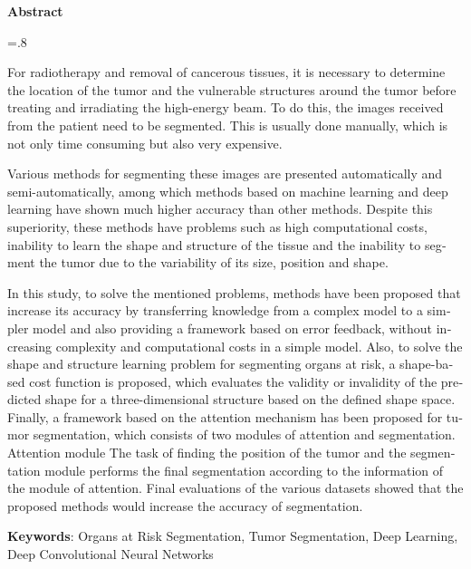 


\pagestyle{empty}

\begin{latin}

\begin{center}
\textbf{Abstract}
\end{center}
\baselineskip=.8\baselineskip

For radiotherapy and removal of cancerous tissues, it is necessary to determine the location of the tumor and the vulnerable structures around the tumor before treating and irradiating the high-energy beam. To do this, the images received from the patient need to be segmented. This is usually done manually, which is not only time consuming but also very expensive.

Various methods for segmenting these images are presented automatically and semi-automatically, among which methods based on machine learning and deep learning have shown much higher accuracy than other methods. Despite this superiority, these methods have problems such as high computational costs, inability to learn the shape and structure of the tissue and the inability to segment the tumor due to the variability of its size, position and shape.

In this study, to solve the mentioned problems, methods have been proposed that increase its accuracy by transferring knowledge from a complex model to a simpler model and also providing a framework based on error feedback, without increasing complexity and computational costs in a simple model. Also, to solve the shape and structure learning problem for segmenting organs at risk, a shape-based cost function is proposed, which evaluates the validity or invalidity of the predicted shape for a three-dimensional structure based on the defined shape space. Finally, a framework based on the attention mechanism has been proposed for tumor segmentation, which consists of two modules of attention and segmentation. Attention module The task of finding the position of the tumor and the segmentation module performs the final segmentation according to the information of the module of attention. Final evaluations of the various datasets showed that the proposed methods would increase the accuracy of segmentation.

\bigskip\noindent\textbf{Keywords}:
Organs at Risk Segmentation, Tumor Segmentation, Deep Learning, Deep Convolutional Neural Networks

\end{latin}

\newpage
